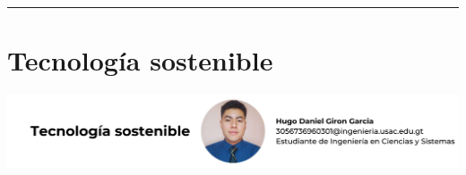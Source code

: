 \documentclass[12pt,spanish,Letterpaper,openany]{book}
\newcommand{\HRule}{\begin{center}\rule{0.5\linewidth}{0.2mm}\end{center}}
\begin{document}
\medskip

\HRule

\medskip

\hypertarget{art11}{%
\chapter{Tecnología sostenible}\label{art11}}

\begin{center}\includegraphics[width=1\linewidth]{autores/art11} \end{center}
\end{document}
